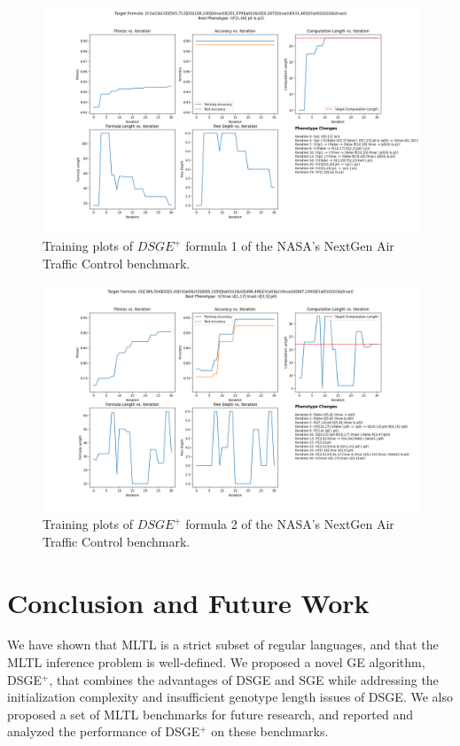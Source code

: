 \documentclass[runningheads]{llncs}
\begin{document}
\begin{figure}
    \centering
    \includegraphics[width=1.1\textwidth]{figs/log_nasa-atc_formula1.txt.png}
    \caption{Training plots of $DSGE^+$ formula 1 of the NASA's NextGen Air Traffic Control benchmark.}
    \label{fig:nasa-atc_formula1}
\end{figure}

\begin{figure}
    \centering
    \includegraphics[width=1.1\textwidth]{figs/log_nasa-atc_formula2.txt.png}
    \caption{Training plots of $DSGE^+$ formula 2 of the NASA's NextGen Air Traffic Control benchmark.}
    \label{fig:nasa-atc_formula2}
\end{figure}

\newpage
\section{Conclusion and Future Work}
We have shown that MLTL is a strict subset of regular languages, and that the MLTL inference problem is well-defined.
We proposed a novel GE algorithm, DSGE$^+$, that combines the advantages of DSGE and SGE while addressing the initialization complexity and insufficient genotype length issues of DSGE.
We also proposed a set of MLTL benchmarks for future research, and reported and analyzed the performance of DSGE$^+$ on these benchmarks.
\end{document}

